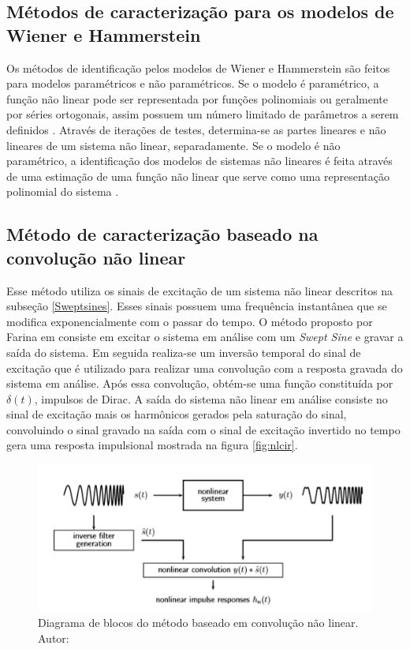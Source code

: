 \subsection*{Métodos de caracterização para os modelos de Wiener e Hammerstein}
Os métodos de identificação pelos modelos de Wiener e Hammerstein são feitos para modelos paramétricos e não paramétricos. Se o modelo é paramétrico, a função não linear pode ser representada por funções polinomiais ou geralmente por séries ortogonais, assim possuem um número limitado de parâmetros a serem definidos \cite{novakdissertation}. Através de iterações de testes, determina-se as partes lineares e não lineares de um sistema não linear, separadamente. Se o modelo é não paramétrico, a identificação dos modelos de sistemas não lineares é feita através de uma estimação de uma função não linear que serve como uma representação polinomial do sistema \cite{greblicki2004nonlinearity}. 

\subsection*{Método de caracterização baseado na convolução não linear}
Esse método utiliza os sinais de excitação de um sistema não linear descritos na subseção \ref{Sweptsines}. Esses sinais possuem uma frequência instantânea que se modifica exponencialmente com o passar do tempo. O método proposto por Farina em \cite{farina2001non} consiste em excitar o sistema em análise com um \textit{Swept Sine} e gravar a saída do sistema. Em seguida	realiza-se um inversão temporal do sinal de excitação que é utilizado para realizar uma convolução com a resposta gravada do sistema em análise. Após essa convolução, obtém-se uma função constituída por $\delta(t)$, impulsos de Dirac. A saída do sistema não linear em análise consiste no sinal de excitação mais os harmônicos gerados pela saturação do sinal, convoluindo o sinal gravado na saída com o sinal de excitação invertido no tempo gera uma resposta impulsional mostrada na figura \ref{fig:nlcir}.

\begin{figure}[!htb]
	\centering
	\includegraphics[width=0.9\linewidth]{figuras/NLCM}
	\caption{Diagrama de blocos do método baseado em convolução não linear. Autor: \cite{novakdissertation}}
	\label{fig:nlcm}
\end{figure}

